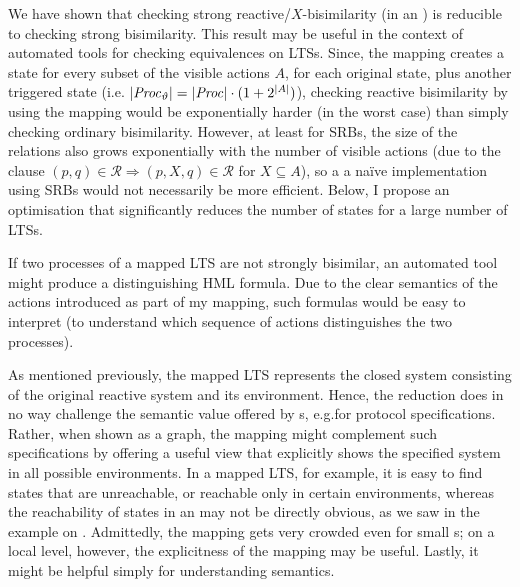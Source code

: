 %
\begin{isabellebody}%
%
%
\isadelimtheory
%
\endisadelimtheory
%
\isatagtheory
%
\endisatagtheory
{\isafoldtheory}%
%
\isadelimtheory
%
\endisadelimtheory
%
\isadelimdocument
%
\endisadelimdocument
%
\isatagdocument
%
\isamarkuptrue%
%
\endisatagdocument
{\isafolddocument}%
%
\isadelimdocument
%
\endisadelimdocument
%
\begin{isamarkuptext}%
\label{chap:discussion}%
\end{isamarkuptext}\isamarkuptrue%
%
\begin{isamarkuptext}%
We have shown that checking strong reactive/$X$-bisimilarity (in an \LTSt{}) is reducible to checking strong bisimilarity. This result may be useful in the context of automated tools for checking equivalences on LTSs.
Since, the mapping creates a state for every subset of the visible actions $A$, for each original state, plus another triggered state (i.e.\@ 
$|\mathit{Proc}_\vartheta| = |\mathit{Proc}| \cdot (1+2^{|A|})$),
checking reactive bisimilarity by using the mapping would be exponentially harder (in the worst case) than simply checking ordinary bisimilarity. However, at least for SRBs, the size of the relations also grows exponentially with the number of visible actions (due to the clause $(p,q)\in\mathcal{R} \Longrightarrow (p,X,q)\in\mathcal{R}$ for $X\subseteq A$), so a a naïve implementation using SRBs would not necessarily be more efficient. Below, I propose an optimisation that significantly reduces the number of states for a large number of LTSs.

If two processes of a mapped LTS are not strongly bisimilar, an automated tool might produce a distinguishing HML formula. Due to the clear semantics of the actions introduced as part of my mapping, such formulas would be easy to interpret (to understand which sequence of actions distinguishes the two processes).

As mentioned previously, the mapped LTS represents the closed system consisting of the original reactive system and its environment. Hence, the reduction does in no way challenge the semantic value offered by \LTSt{}s, e.g.\@ for protocol specifications. Rather, when shown as a graph, the mapping might complement such specifications by offering a useful view that explicitly shows the specified system in all possible environments. In a mapped LTS, for example, it is easy to find states that are unreachable, or reachable only in certain environments, whereas the reachability of states in an \LTSt{} may not be directly obvious, as we saw in the example on . Admittedly, the mapping gets very crowded even for small \LTSt{}s; on a local level, however, the explicitness of the mapping may be useful. Lastly, it might be helpful simply for understanding \LTSt{} semantics.


\end{isamarkuptext}
\end{isabellebody}
